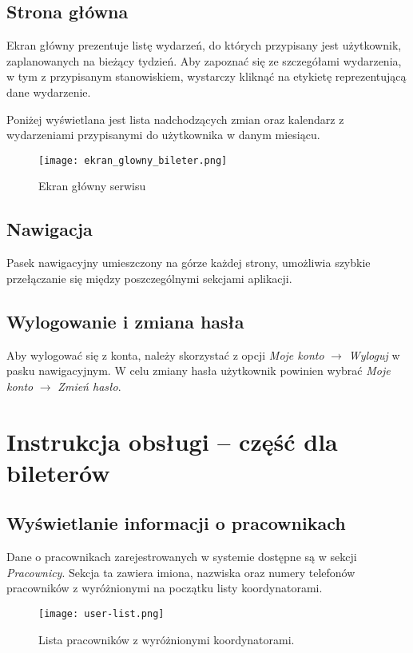 \documentclass[shortabstract]{iithesis}
\begin{document}
\subsection{Strona główna}

Ekran główny prezentuje listę wydarzeń, do których przypisany jest użytkownik, zaplanowanych
na bieżący tydzień. Aby zapoznać się ze szczegółami wydarzenia, w tym z przypisanym stanowiskiem, wystarczy kliknąć na etykietę reprezentującą dane wydarzenie.

Poniżej wyświetlana jest lista nadchodzących zmian oraz kalendarz z wydarzeniami przypisanymi do użytkownika w danym miesiącu.

\begin{figure}[h!]
    \centering
    \texttt{[image: ekran\_glowny\_bileter.png]}
    \caption{Ekran główny serwisu}
    \label{fig:glowny}
\end{figure}

\subsection{Nawigacja}
Pasek nawigacyjny umieszczony na górze każdej strony, umożliwia szybkie przełączanie się między poszczególnymi sekcjami aplikacji.

\subsection{Wylogowanie i zmiana hasła}
Aby wylogować się z konta, należy skorzystać z opcji \textit{Moje konto} $\rightarrow$ \textit{Wyloguj} w pasku nawigacyjnym. W celu zmiany hasła użytkownik powinien wybrać \textit{Moje konto} $\rightarrow$ \textit{Zmień hasło}.


\section{Instrukcja obsługi – część dla bileterów}

\subsection{Wyświetlanie informacji o pracownikach}

Dane o pracownikach zarejestrowanych w systemie dostępne są w sekcji \textit{Pracownicy}. Sekcja ta zawiera imiona, nazwiska oraz numery telefonów pracowników z wyróżnionymi na początku listy koordynatorami.

\begin{figure}[h!]
    \centering
    \texttt{[image: user-list.png]}
    \caption{Lista pracowników z wyróżnionymi koordynatorami.}
    \label{fig:user-list}
\end{figure}
\newpage
\end{document}
